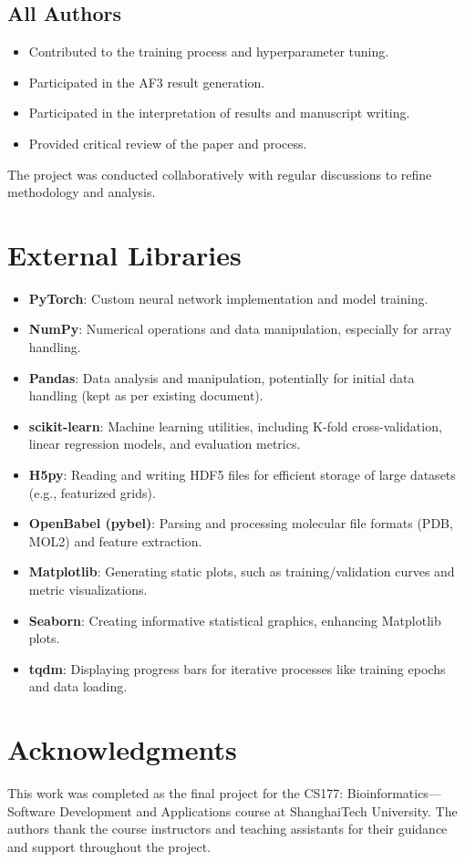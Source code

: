 \documentclass[unnumsec,webpdf,contemporary,large]{oup-authoring-template}
\theoremstyle{thmstyleone}%
\theoremstyle{thmstyletwo}%
\theoremstyle{thmstylethree}%
\begin{document}
\subsection{All Authors}
\begin{itemize}
    \item Contributed to the training process and hyperparameter tuning.
    \item Participated in the AF3 result generation.
    \item Participated in the interpretation of results and manuscript writing.
    \item Provided critical review of the paper and process.
\end{itemize}  

The project was conducted collaboratively with regular 
discussions to refine methodology and analysis.

\section{External Libraries}

\begin{itemize}
    \item \textbf{PyTorch}: Custom neural network implementation and model training.
    \item \textbf{NumPy}: Numerical operations and data manipulation, especially for array handling.
    \item \textbf{Pandas}: Data analysis and manipulation, potentially for initial data handling (kept as per existing document).
    \item \textbf{scikit-learn}: Machine learning utilities, including K-fold cross-validation, linear regression models, and evaluation metrics.
    \item \textbf{H5py}: Reading and writing HDF5 files for efficient storage of large datasets (e.g., featurized grids).
    \item \textbf{OpenBabel (pybel)}: Parsing and processing molecular file formats (PDB, MOL2) and feature extraction.
    \item \textbf{Matplotlib}: Generating static plots, such as training/validation curves and metric visualizations.
    \item \textbf{Seaborn}: Creating informative statistical graphics, enhancing Matplotlib plots.
    \item \textbf{tqdm}: Displaying progress bars for iterative processes like training epochs and data loading.
\end{itemize}

\section{Acknowledgments}
This work was completed as the final project for the CS177: Bioinformatics—Software Development 
and Applications course at ShanghaiTech University. 
The authors thank the course instructors and teaching assistants 
for their guidance and support throughout the project.




\end{document}
